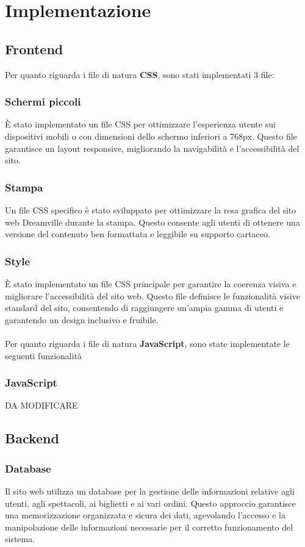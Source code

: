 \section{Implementazione}
\subsection{Frontend}
Per quanto riguarda i file di natura \textbf{CSS}, sono stati implementati 3 file:
\subsubsection{Schermi piccoli}
È stato implementato un file CSS per ottimizzare l'esperienza utente sui dispositivi mobili o con dimensioni dello schermo inferiori a 768px. Questo file garantisce un layout responsive, migliorando la navigabilità e l'accessibilità del sito.

\subsubsection{Stampa}
Un file CSS specifico è stato sviluppato per ottimizzare la resa grafica del sito web Dreamville durante la stampa. Questo consente agli utenti di ottenere una versione del contenuto ben formattata e leggibile su supporto cartaceo.

\subsubsection{Style}
È stato implementato un file CSS principale per garantire la coerenza visiva e migliorare l'accessibilità del sito web. Questo file definisce le funzionalità visive standard del sito, consentendo di raggiungere un'ampia gamma di utenti e garantendo un design inclusivo e fruibile.
\\ \\
Per quanto riguarda i file di natura \textbf{JavaScript}, sono state implementate le seguenti funzionalità 
\subsubsection{JavaScript}
DA MODIFICARE

\subsection{Backend}
\subsubsection{Database}
Il sito web utilizza un database per la gestione delle informazioni relative agli utenti, agli spettacoli, ai biglietti e ai vari ordini. Questo approccio garantisce una memorizzazione organizzata e sicura dei dati, agevolando l'accesso e la manipolazione delle informazioni necessarie per il corretto funzionamento del sistema.
\\
\begin{minipage}{0.3\textwidth}
     
\end{minipage}

